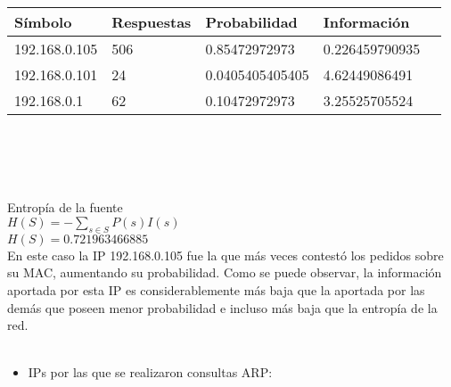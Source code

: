 \newpage

\begin{tabular}{|l|l|l|l|l|}
  \hline
  S\'imbolo & Respuestas & Probabilidad & Informaci\'on \\
  \hline
  192.168.0.105 & 506 & 0.85472972973 & 0.226459790935 \\
  \hline
  192.168.0.101 & 24 & 0.0405405405405 & 4.62449086491 \\
  \hline
  192.168.0.1 & 62 & 0.10472972973 & 3.25525705524\\
  \hline
\end{tabular}\\

\\ \ \\ \ \\ 
Entrop\'ia de la fuente\\
$H(S) = -\sum_{s \in S} P(s) I(s)$\\
$H(S) = 0.721963466885$\\

En este caso la IP 192.168.0.105 fue la que m\'as veces contest\'o los pedidos sobre su MAC, aumentando su probabilidad. Como se puede observar, la informaci\'on
aportada por esta IP es considerablemente m\'as baja que la aportada por las dem\'as que poseen menor probabilidad e incluso m\'as baja que la entrop\'ia de la red.\\\\

\newpage
\begin{itemize}
 \item IPs por las que se realizaron consultas ARP:\\
\end{itemize}

